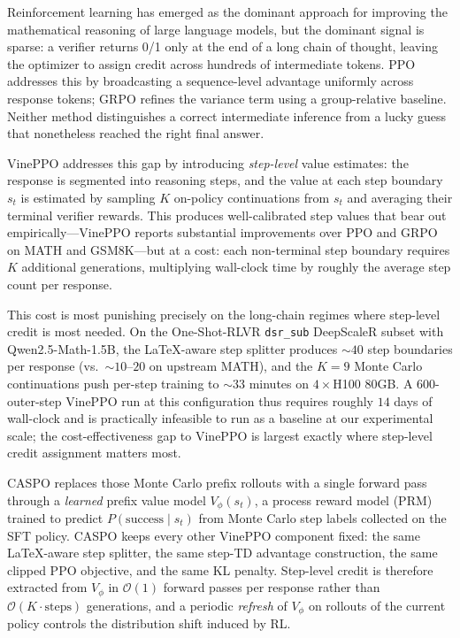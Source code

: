 \documentclass[11pt]{article}
\newcommand{\caspo}{\textsc{CASPO}}
\newcommand{\ppo}{PPO}
\newcommand{\grpo}{GRPO}
\newcommand{\vineppo}{VinePPO}
\begin{document}
Reinforcement learning has emerged as the dominant approach for improving the
mathematical reasoning of large language models, but the dominant signal is
sparse: a verifier returns 0/1 only at the end of a long chain of thought,
leaving the optimizer to assign credit across hundreds of intermediate tokens.
\ppo{} \citep{schulman2017ppo} addresses this by broadcasting a sequence-level
advantage uniformly across response tokens; \grpo{} \citep{deepseekmath2024}
refines the variance term using a group-relative baseline. Neither method
distinguishes a correct intermediate inference from a lucky guess that
nonetheless reached the right final answer.

\vineppo{} \citep{vineppo2024} addresses this gap by introducing
\emph{step-level} value estimates: the response is segmented into reasoning
steps, and the value at each step boundary $s_t$ is estimated by sampling $K$
on-policy continuations from $s_t$ and averaging their terminal verifier
rewards. This produces well-calibrated step values that bear out
empirically---\vineppo{} reports substantial improvements over \ppo{} and
\grpo{} on MATH and GSM8K---but at a cost: each non-terminal step boundary
requires $K$ additional generations, multiplying wall-clock time by roughly
the average step count per response.

This cost is most punishing precisely on the long-chain regimes where
step-level credit is most needed. On the One-Shot-RLVR \texttt{dsr\_sub}
DeepScaleR subset with Qwen2.5-Math-1.5B, the LaTeX-aware step splitter
produces ${\sim}40$ step boundaries per response (vs.\ ${\sim}10$--$20$ on
upstream MATH), and the $K{=}9$ Monte Carlo continuations push per-step
training to ${\sim}33$ minutes on $4 \times$H100 80GB. A 600-outer-step
\vineppo{} run at this configuration thus requires roughly $14$ days of
wall-clock and is practically infeasible to run as a baseline at our
experimental scale; the cost-effectiveness gap to \vineppo{} is largest
exactly where step-level credit assignment matters most.

\caspo{} replaces those Monte Carlo prefix rollouts with a single forward
pass through a \emph{learned} prefix value model $V_\phi(s_t)$, a process
reward model (PRM) trained to predict $P(\text{success} \mid s_t)$ from
Monte Carlo step labels collected on the SFT policy. \caspo{} keeps every
other \vineppo{} component fixed: the same LaTeX-aware step splitter, the
same step-TD advantage construction, the same clipped PPO objective, and
the same KL penalty. Step-level credit is therefore extracted from
$V_\phi$ in $\mathcal{O}(1)$ forward passes per response rather than
$\mathcal{O}(K \cdot \text{steps})$ generations, and a periodic
\emph{refresh} of $V_\phi$ on rollouts of the current policy controls the
distribution shift induced by RL.
\end{document}
